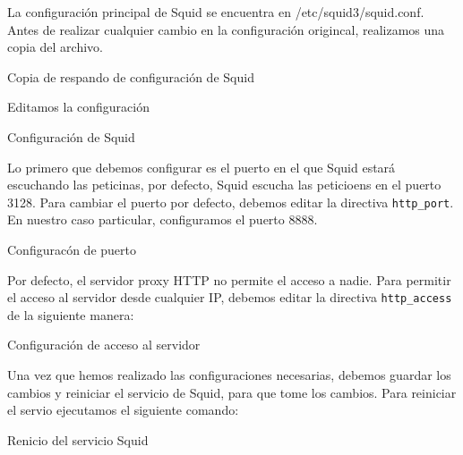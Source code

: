 La configuración principal de Squid se encuentra en /etc/squid3/squid.conf.  Antes de realizar cualquier cambio en la configuración origincal, realizamos una copia del archivo.

\begin{listing}[H]
  \caption{Copia de respando de configuración de Squid}
  \label{soa:tecnologias:squid-cache02:bash-preparacion}
\end{listing}

Editamos la configuración

\begin{listing}[H]
  \caption{Configuración de Squid}
  \label{soa:tecnologias:squid-cache03:bash-preparacion}
\end{listing}

Lo primero que debemos configurar es el puerto en el que Squid estará escuchando las peticinas, por defecto, Squid escucha las peticioens en el puerto 3128.  Para cambiar el puerto por defecto, debemos editar la directiva \texttt{http\_port}.  En nuestro caso particular, configuramos el puerto 8888.

\begin{listing}[H]
  \caption{Configuracón de puerto}
  \label{soa:tecnologias:squid-cache04:bash-preparacion}
\end{listing}

Por defecto, el servidor proxy HTTP no permite el acceso a nadie.  Para permitir el acceso al servidor desde cualquier IP, debemos editar la directiva \texttt{http\_access} de la siguiente manera:

\begin{listing}[H]
  \caption{Configuración de acceso al servidor}
  \label{soa:tecnologias:squid-cache05:bash-preparacion}
\end{listing}

Una vez que hemos realizado las configuraciones necesarias, debemos guardar los cambios y reiniciar el servicio de Squid, para que tome los cambios.  Para reiniciar el servio ejecutamos el siguiente comando:

\begin{listing}[H]
  \caption{Renicio del servicio Squid}
  \label{soa:tecnologias:squid-cache06:bash-preparacion}
\end{listing}

